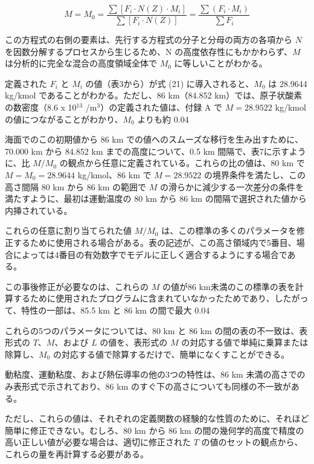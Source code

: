 \documentclass{article}
\begin{document}
\begin{equation}
 M = M_0 = \frac{\sum [F_i \cdot N(Z) \cdot M_i]}{\sum [F_i \cdot N(Z)]} = \frac{\sum (F_i \cdot M_i)}{\sum F_i} \tag{21}
\end{equation}

この方程式の右側の要素は、先行する方程式の分子と分母の両方の各項から $N$ を因数分解するプロセスから生じるため、N の高度依存性にもかかわらず、$M$ は分析的に完全な混合の高度領域全体で $M_0$ に等しいことがわかる。

定義された $F_i$ と $M_i$ の値（表3から）が式 (21) に導入されると、$M_0$ は 28.9644 kg/kmol であることがわかる。ただし、86 km（84.852 km）では、原子状酸素の数密度（8.6 x 10$^{13}$ /m$^3$）の定義された値は、付録 A で $M = 28.9522$ kg/kmol の値につながることがわかり、$M_0$ よりも約 0.04%

海面でのこの初期値から 86 km での値へのスムーズな移行を生み出すために、70.000 km から 84.852 km までの高度について、0.5 km 間隔で、表7に示すように、比 $M / M_0$ の観点から任意に定義されている。これらの比の値は、80 km で $M = M_0 = 28.9644$ kg/kmol、86 km で $M = 28.9522$ の境界条件を満たし、この高さ間隔 80 km から 86 km の範囲で $M$ の滑らかに減少する一次差分の条件を満たすように、最初は運動温度の 80 km から 86 km の間隔で選択された値から内挿されている。

これらの任意に割り当てられた値 $M / M_0$ は、この標準の多くのパラメータを修正するために使用される場合がある。表の記述が、この高さ領域内で5番目、場合によっては4番目の有効数字でモデルに正しく適合するようにする場合である。

この事後修正が必要なのは、これらの $M$ の値が86 km未満のこの標準の表を計算するために使用されたプログラムに含まれていなかったためであり、したがって、特性の一部は、85.5 km と 86 km の間で最大 0.04%

これらの5つのパラメータについては、80 km と 86 km の間の表の不一致は、表形式の $T$、$M$、および $L$ の値を、表形式の $M$ の対応する値で単純に乗算または除算し、$M_0$ の対応する値で除算するだけで、簡単になくすことができる。

動粘度、運動粘度、および熱伝導率の他の3つの特性は、86 km 未満の高さでのみ表形式で示されており、86 km のすぐ下の高さについても同様の不一致がある。

ただし、これらの値は、それぞれの定義関数の経験的な性質のために、それほど簡単に修正できない。むしろ、80 km から 86 km の間の幾何学的高度で精度の高い正しい値が必要な場合は、適切に修正された $T$ の値のセットの観点から、これらの量を再計算する必要がある。
\end{document}
